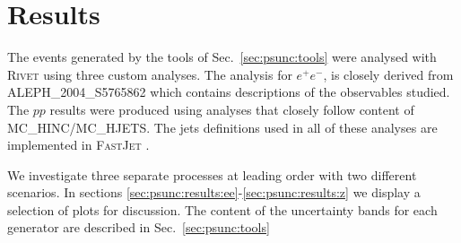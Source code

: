 \section{Results}
\label{sec:psunc:results}
The events generated by the tools of Sec.~\ref{sec:psunc:tools} were analysed
with \textsc{Rivet} \cite{Buckley:2010ar} using three custom analyses. The
analysis for $e^+e^-$, is closely derived from \textsc{ALEPH\_2004\_S5765862}
\cite{Heister:2003aj} which contains descriptions of the observables
studied. The $pp$ results were produced using analyses that closely follow
content of \textsc{MC\_HINC}/\textsc{MC\_HJETS}. The jets definitions used in
all of these analyses are implemented in \textsc{FastJet}
\cite{Cacciari:2011ma}.

We investigate three separate processes at leading order with two different
scenarios. In sections \ref{sec:psunc:results:ee}-\ref{sec:psunc:results:z} we
display a selection of plots for discussion. The content of the uncertainty
bands for each generator are described in Sec.~\ref{sec:psunc:tools}

